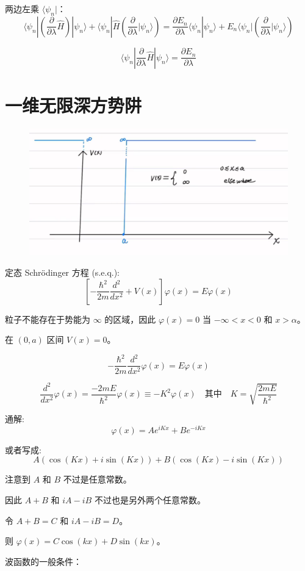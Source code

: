 \documentclass[lang=cn,10pt]{elegantbook}
\begin{document}
两边左乘 \(\langle \psi_n|\)：
\[
\langle \psi_n| \left( \frac{\partial}{\partial \lambda} \hat{H} \right) |\psi_n\rangle + \langle \psi_n| \hat{H} \left( \frac{\partial}{\partial \lambda} |\psi_n\rangle \right) = \frac{\partial E_n}{\partial \lambda} \langle \psi_n|\psi_n\rangle + E_n \langle \psi_n| \left( \frac{\partial}{\partial \lambda} |\psi_n\rangle \right)
\]

\[
\langle \psi_n| \frac{\partial}{\partial \lambda} \hat{H} |\psi_n\rangle = \frac{\partial E_n}{\partial \lambda}
\]
\section{一维无限深方势阱}
\begin{figure}[H]
	\centering
	\includegraphics[width=0.7\linewidth]{figure/screenshot0020}
\end{figure}

定态 Schrödinger 方程 (s.e.q.):
\[
\left[-\frac{\hbar^2}{2m}\frac{d^2}{dx^2} + V(x)\right]\varphi(x) = E\varphi(x)
\]

粒子不能存在于势能为 $\infty$ 的区域，因此 $\varphi(x) = 0$ 当 $-\infty < x < 0$ 和 $x > \alpha$。

在 $(0, a)$ 区间 $V(x) = 0$。

\[
-\frac{\hbar^2}{2m}\frac{d^2}{dx^2}\varphi(x) = E\varphi(x)
\]

\[
\frac{d^2}{dx^2}\varphi(x) = \frac{-2mE}{\hbar^2}\varphi(x) \equiv -K^2\varphi(x) \quad \text{其中} \quad K = \sqrt{\frac{2mE}{\hbar^2}}
\]

通解:
\[
\varphi(x) = A e^{i K x} + B e^{-i K x}
\]

或者写成:
\[
A(\cos(Kx) + i \sin(Kx)) + B(\cos(Kx) - i \sin(Kx))
\]

注意到 $A$ 和 $B$ 不过是任意常数。

因此 $A+B$ 和 $iA-iB$ 不过也是另外两个任意常数。

令 $A+B = C$ 和 $iA-iB = D$。

则 $\varphi(x) = C \cos(kx) + D \sin(kx)$。

波函数的一般条件：
\end{document}
